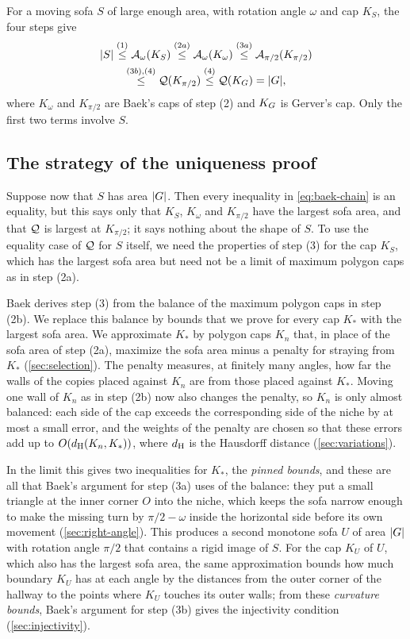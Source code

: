 For a moving sofa $S$ of large enough area, with rotation angle $\omega$ and cap
$K_S$, the four steps give
\begin{multline}\label{eq:baek-chain}
  \lvert S\rvert\overset{(1)}{\le}\mathcal{A}_\omega(K_S)\overset{(2a)}{\le}\mathcal{A}_\omega(K_\omega)
    \overset{(3a)}{\le}\mathcal{A}_{\pi/2}(K_{\pi/2})\\
  \overset{(3b),(4)}{\le}\mathcal{Q}(K_{\pi/2})\overset{(4)}{\le}\mathcal{Q}(K_G)=\lvert G\rvert ,
\end{multline}
where $K_\omega$ and $K_{\pi/2}$ are Baek's caps of step (2) and $K_G$ is
Gerver's cap. Only the first two terms involve $S$.

\subsection{The strategy of the uniqueness proof}\label{sec:strategy-uniqueness}

Suppose now that $S$ has area $\lvert G\rvert$. Then every inequality in
\eqref{eq:baek-chain} is an equality, but this says only that $K_S$, $K_\omega$
and $K_{\pi/2}$ have the largest sofa area, and that $\mathcal{Q}$ is largest at
$K_{\pi/2}$; it says nothing about the shape of $S$. To use the equality case of
$\mathcal{Q}$ for $S$ itself, we need the properties of step (3) for the cap $K_S$,
which has the largest sofa area but need not be a limit of maximum polygon caps
as in step (2a).

Baek derives step (3) from the balance of the maximum polygon caps in step (2b).
We replace this balance by bounds that we prove for every cap $K_*$ with the
largest sofa area. We approximate $K_*$ by polygon caps $K_n$ that, in place of
the sofa area of step (2a), maximize the sofa area minus a penalty for straying
from $K_*$ (\cref{sec:selection}). The penalty measures, at finitely many
angles, how far the walls of the copies placed against $K_n$ are from those
placed against $K_*$. Moving one wall of $K_n$ as in step (2b) now also changes
the penalty, so $K_n$ is only almost balanced: each side of the cap exceeds the
corresponding side of the niche by at most a small error, and the weights of the
penalty are chosen so that these errors add up to $O(d_{\mathrm{H}}(K_n,K_*))$, where $d_{\mathrm{H}}$
is the Hausdorff distance (\cref{sec:variations}).

In the limit this gives two inequalities for $K_*$, the \emph{pinned bounds},
and these are all that Baek's argument for step (3a) uses of the balance: they
put a small triangle at the inner corner $O$ into the niche, which keeps the
sofa narrow enough to make the missing turn by $\pi/2-\omega$ inside the
horizontal side before its own movement (\cref{sec:right-angle}). This produces
a second monotone sofa $U$ of area $\lvert G\rvert$ with rotation angle $\pi/2$ that
contains a rigid image of $S$. For the cap $K_U$ of $U$, which also has the
largest sofa area, the same approximation bounds how much boundary $K_U$ has at
each angle by the distances from the outer corner of the hallway to the points
where $K_U$ touches its outer walls; from these \emph{curvature bounds}, Baek's
argument for step (3b) gives the injectivity condition (\cref{sec:injectivity}).

